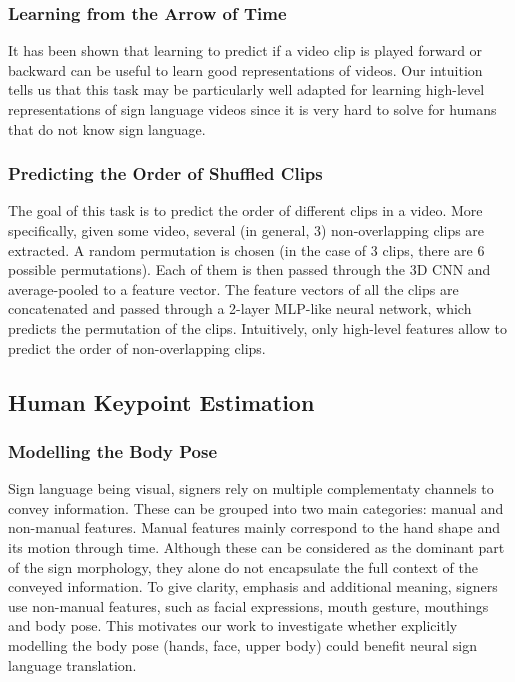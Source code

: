 \documentclass[final]{cvpr}
\begin{document}
\subsubsection{Learning from the Arrow of Time}
It has been shown \cite{arrow} that learning to predict if a video clip is played forward or backward can be useful to learn good representations of videos. Our intuition tells us that this task may be particularly well adapted for learning high-level representations of sign language videos since it is very hard to solve for humans that do not know sign language.

\subsubsection{Predicting the Order of Shuffled Clips}
The goal of this task is to predict the order of different clips in a video. More specifically, given some video, several (in general, 3) non-overlapping clips are extracted. A random permutation is chosen (in the case of 3 clips, there are 6 possible permutations). Each of them is then passed through the 3D CNN and average-pooled to a feature vector. The feature vectors of all the clips are concatenated and passed through a 2-layer MLP-like neural network, which predicts the permutation of the clips. Intuitively, only high-level features allow to predict the order of non-overlapping clips.
\subsection{Human Keypoint Estimation}
\subsubsection{Modelling the Body Pose}
Sign language being visual, signers rely on multiple complementaty channels to convey information. These can be grouped into two main categories: manual and non-manual features. Manual features mainly correspond to the hand shape and its motion through time. Although these can be considered as the dominant part of the sign morphology, they alone do not encapsulate the full context of the conveyed information. To give clarity, emphasis and additional meaning, signers use non-manual features, such as facial expressions, mouth gesture, mouthings and body pose. This motivates our work to investigate whether explicitly modelling the body pose (hands, face, upper body) could benefit neural sign language translation.
\end{document}
